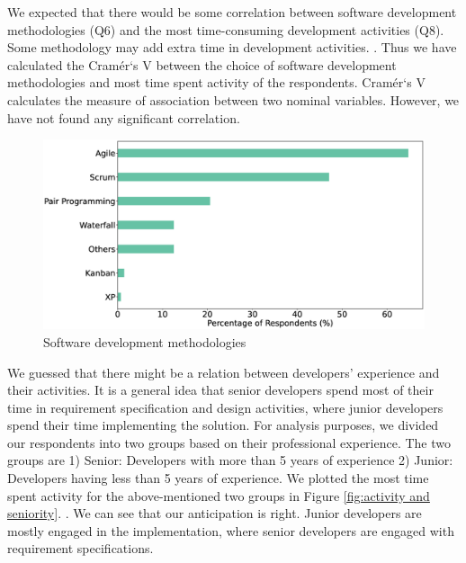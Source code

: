 We expected that there would be some correlation between software development methodologies (Q6) and the most time-consuming development activities (Q8). Some methodology may add extra time in development activities. . Thus we have calculated the Cramér`s V \cite{Cramer1946} between the choice of software development methodologies and most time spent activity of the respondents. Cramér`s V calculates the measure of association between two nominal variables\cite{Sheskin2007}. However, we have not found any significant correlation.

\begin{figure}[h]
\centering
  \includegraphics[scale=0.18]{Figures/Respondents_Methodology}
  \caption{Software development methodologies}
  \label{fig:methodologies}
\end{figure}

We guessed that there might be a relation between developers' experience and their activities. It is a general idea that senior developers spend most of their time in requirement specification and design activities, where junior developers spend their time implementing the solution. For analysis purposes, we divided our respondents into two groups based on their professional experience. The two groups are 1) Senior: Developers with more than 5 years of experience 2) Junior: Developers having less than 5 years of experience. We plotted the most time spent activity for the above-mentioned two groups in Figure \ref{fig:activity and seniority}. . We can see that our anticipation is right. Junior developers are mostly engaged in the implementation, where senior developers are engaged with requirement specifications.

